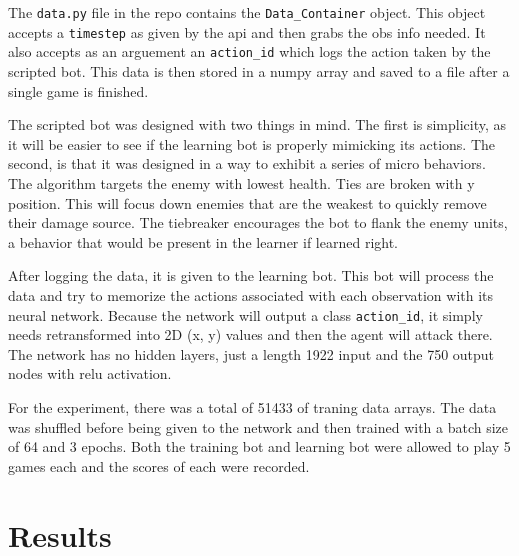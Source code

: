 \documentclass{amsart}
\theoremstyle{definition}
\begin{document}
The {\tt data.py} file in the repo contains the {\tt Data\_Container} object.
This object accepts a {\tt timestep} as given by the api and then grabs the obs info needed.
It also accepts as an arguement an {\tt action\_id} which logs the action taken by the scripted bot.
This data is then stored in a numpy array and saved to a file after a single game is finished.

The scripted bot was designed with two things in mind.
The first is simplicity, as it will be easier to see if the learning bot is properly mimicking its actions.
The second, is that it was designed in a way to exhibit a series of micro behaviors.
The algorithm targets the enemy with lowest health.
Ties are broken with y position.
This will focus down enemies that are the weakest to quickly remove their damage source.
The tiebreaker encourages the bot to flank the enemy units, a behavior that would be present in the learner if learned right.

After logging the data, it is given to the learning bot.
This bot will process the data and try to memorize the actions associated with each observation with its neural network.
Because the network will output a class {\tt action\_id}, it simply needs retransformed into 2D (x, y) values and then the agent will attack there.
The network has no hidden layers, just a length 1922 input and the 750 output nodes with relu activation.

For the experiment, there was a total of 51433 of traning data arrays.
The data was shuffled before being given to the network and then trained with a batch size of 64 and 3 epochs.
Both the training bot and learning bot were allowed to play 5 games each and the scores of each were recorded.











\section{Results}
\end{document}
